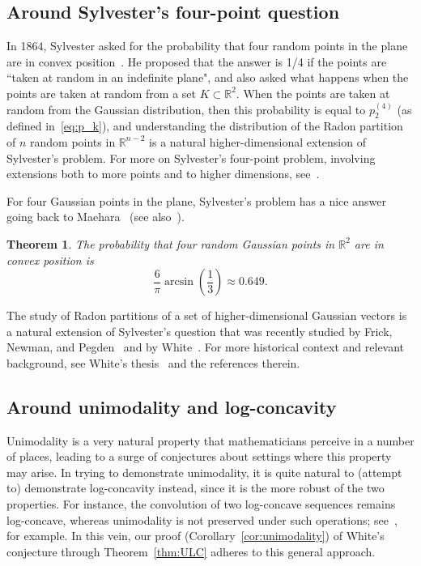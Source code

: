 \documentclass[12pt,english,reqno]{amsart}
\theoremstyle{plain}
\newtheorem{thm}{Theorem}[section]
\theoremstyle{remark}
\numberwithin{figure}{section}
\numberwithin{equation}{section}
\def\rr{\mathbb{R}}
\begin{document}
\subsection*{Around Sylvester's four-point question}
In 1864, Sylvester asked for the probability that four random points in the plane are in convex position~\citep{Syl64}. He proposed that the answer is 1/4 if the points are ``taken at random in an indefinite plane", and also asked what happens when the points are taken at random from a set $K \subset \rr^2$. When the points are taken at random from the Gaussian distribution, then this probability is equal to $p_2^{(4)}$ (as defined in~\eqref{eq:p_k}), and understanding the distribution of the Radon partition of $n$ random points in $\mathbb R^{n-2}$ is a natural higher-dimensional extension of Sylvester's problem. For more on Sylvester's four-point problem, involving extensions both to more points and to higher dimensions, see~\citep{Syl64,Pfi89,Bar99,Val95}.

For four Gaussian points in the plane, Sylvester's problem has a nice answer going back to Maehara~\citep{Mae78} (see also~\citep{Bla08}).
\begin{thm}
The probability that four random Gaussian points in $\mathbb R^2$ are in convex position is
\[\frac {6}{\pi}\arcsin (\frac {1}{3} )\approx 0.649 .\]
\end {thm}
The study of Radon partitions of a set of higher-dimensional Gaussian vectors is a natural extension of Sylvester's question that was recently studied by Frick, Newman, and Pegden~\citep{FNP25} and by White~\citep{White}. For more historical context and relevant background, see White's thesis~\citep{White} and the references therein.



\subsection*{Around unimodality and log-concavity} Unimodality is a very natural property that mathematicians perceive in a number of places, leading to a surge of conjectures about settings where this property may arise. In trying to demonstrate unimodality, it is quite natural to (attempt to) demonstrate log-concavity instead, since it is the more robust of the two properties. For instance, the convolution of two log-concave sequences remains log-concave, whereas unimodality is not preserved under such operations; see~\citep{Lig}, for example. In this vein, our proof (Corollary~\ref{cor:unimodality}) of White's conjecture through Theorem~\ref{thm:ULC} adheres to this general approach.
\end{document}
